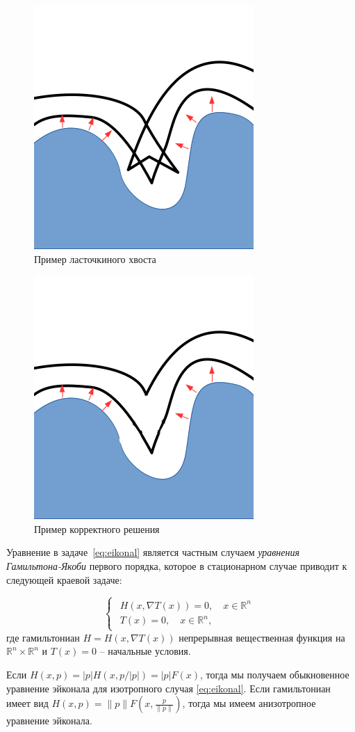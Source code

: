 \documentclass[a4paper,12pt]{article}
\begin{document}
\begin{figure}[h]
  \centering
  \includegraphics[width=0.3\linewidth]{swallow-tail-example.png}
  \hfil \caption{Пример ласточкиного хвоста}
  \label{fig:swallow-ex}

\end{figure}

\begin{figure}[h]
  \centering
  \includegraphics[width=0.3\linewidth]{corrct-example.png}
  \hfil \caption{Пример корректного решения}
  \label{fig:correct-exmp}

\end{figure}

Уравнение в задаче~\eqref{eq:eikonal} является частным случаем
\textit{уравнения Гамильтона-Якоби} первого порядка, которое в
стационарном случае приводит к следующей краевой задаче:

\begin{equation}
  \label{eq:hje}
  \begin{cases}
    \begin{array}{ll}
      H(x, \nabla T(x)) = 0,\quad x \in \mathbb{R}^n  \\
      T(x) = 0, \quad  x \in \mathbb{R}^n,
    \end{array}
  \end{cases}
\end{equation}
где гамильтониан $H = H(x,\nabla T(x))$ непрерывная вещественная функция на
$\mathbb{R}^n \times \mathbb{R}^n$ и $T(x) = 0$ -- начальные условия.

Если $H(x,p) = |p| H(x,p/|p|) = |p| F(x)$, тогда мы получаем
обыкновенное уравнение эйконала для изотропного случая
\eqref{eq:eikonal}. Если гамильтониан имеет вид
$H(x,p) = \|p\| F(x, \frac{p}{\|p\|})$, тогда мы имеем анизотропное
уравнение эйконала.
\end{document}
